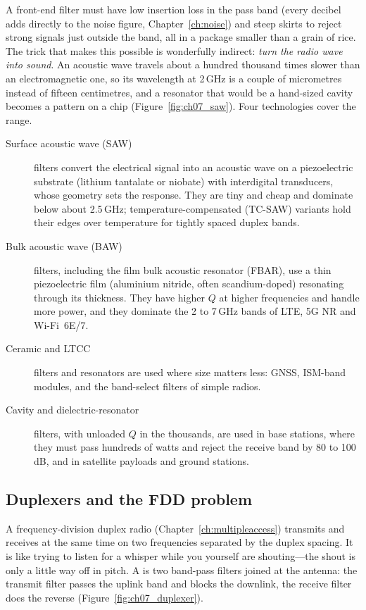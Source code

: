 A front-end filter must have low insertion loss in the pass band (every decibel adds directly to the
noise figure, Chapter~\ref{ch:noise}) and steep skirts to reject strong signals just outside the band,
all in a package smaller than a grain of rice. The trick that makes this possible is wonderfully
indirect: \emph{turn the radio wave into sound}. An acoustic wave travels about a hundred thousand
times slower than an electromagnetic one, so its wavelength at 2\,GHz is a couple of micrometres
instead of fifteen centimetres, and a resonator that would be a hand-sized cavity becomes a pattern
on a chip (Figure~\ref{fig:ch07_saw}). Four technologies cover the range.
\begin{description}
\item[Surface acoustic wave (SAW)] filters convert the electrical signal into an acoustic wave on a
piezoelectric substrate (lithium tantalate or niobate) with interdigital transducers, whose geometry
sets the response. They are tiny and cheap and dominate below about 2.5\,GHz; temperature-compensated
(TC-SAW) variants hold their edges over temperature for tightly spaced duplex bands.
\item[Bulk acoustic wave (BAW)] filters, including the film bulk acoustic resonator (FBAR), use a
thin piezoelectric film (aluminium nitride, often scandium-doped) resonating through its thickness.
They have higher $Q$ at higher frequencies and handle more power, and they dominate the 2 to 7\,GHz
bands of LTE, 5G NR and Wi-Fi~6E/7.
\item[Ceramic and LTCC] filters and resonators are used where size matters less: GNSS, ISM-band
modules, and the band-select filters of simple radios.
\item[Cavity and dielectric-resonator] filters, with unloaded $Q$ in the thousands, are used in base
stations, where they must pass hundreds of watts and reject the receive band by 80 to 100\,dB, and in
satellite payloads and ground stations.
\end{description}

\subsection{Duplexers and the FDD problem}

A frequency-division duplex radio (Chapter~\ref{ch:multipleaccess}) transmits and receives at the same
time on two frequencies separated by the duplex spacing. It is like trying to listen for a whisper
while you yourself are shouting---the shout is only a little way off in pitch. A  is two
band-pass filters joined at the antenna: the transmit filter passes the uplink band and blocks the
downlink, the receive filter does the reverse (Figure~\ref{fig:ch07_duplexer}).

